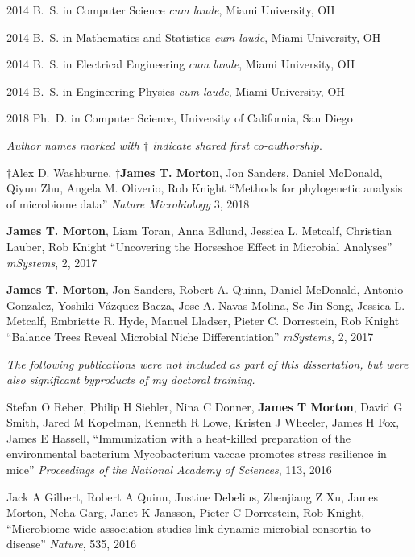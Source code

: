 \begin{frontmatter}
\begin{vitapage}
\begin{vita}
  \item[2014] B.~S. in Computer Science \emph{cum laude}, Miami University, OH
  \item[2014] B.~S. in Mathematics and Statistics \emph{cum laude}, Miami University, OH
  \item[2014] B.~S. in Electrical Engineering \emph{cum laude}, Miami University, OH
  \item[2014] B.~S. in Engineering Physics \emph{cum laude}, Miami University, OH
  \item[2018] Ph.~D. in Computer Science, University of California, San Diego
\end{vita}
\begin{publications}
    \item \textsl{Author names marked with $\dagger$ indicate shared first co-authorship}.

    \item $\dagger$Alex D. Washburne, \textbf{$\dagger$James T. Morton}, Jon Sanders, Daniel McDonald, Qiyun Zhu, Angela M. Oliverio, Rob Knight  ``Methods for phylogenetic analysis of microbiome data'' \emph{Nature Microbiology} 3, 2018

    \item  \textbf{James T. Morton}, Liam Toran, Anna Edlund, Jessica L. Metcalf, Christian Lauber, Rob Knight ``Uncovering the Horseshoe Effect in Microbial Analyses'' \emph{mSystems}, 2, 2017

    \item \textbf{James T. Morton}, Jon Sanders, Robert A. Quinn, Daniel McDonald, Antonio Gonzalez, Yoshiki Vázquez-Baeza, Jose A. Navas-Molina, Se Jin Song, Jessica L. Metcalf, Embriette R. Hyde, Manuel Lladser, Pieter C. Dorrestein, Rob Knight ``Balance Trees Reveal Microbial Niche Differentiation'' \emph{mSystems}, 2, 2017

    \textsl{The following publications were not included as part of this dissertation, but were also significant byproducts of my doctoral training.}
\item  Stefan O Reber, Philip H  Siebler, Nina C  Donner, \textbf{James T Morton}, David G  Smith, Jared M  Kopelman, Kenneth R  Lowe, Kristen J  Wheeler, James H  Fox, James E  Hassell,  ``Immunization with a heat-killed preparation of the environmental bacterium Mycobacterium vaccae promotes stress resilience in mice'' \emph{Proceedings of the National Academy of Sciences}, 113, 2016

    \item  Jack A Gilbert, Robert A  Quinn, Justine  Debelius, Zhenjiang Z  Xu, James  Morton, Neha  Garg, Janet K  Jansson, Pieter C  Dorrestein, Rob  Knight,  ``Microbiome-wide association studies link dynamic microbial consortia to disease'' \emph{Nature}, 535, 2016


\end{publications}
\end{vitapage}
\end{frontmatter}

